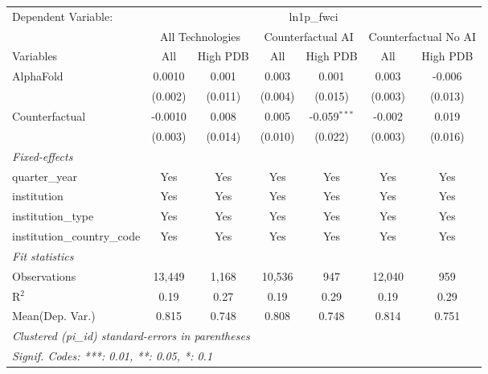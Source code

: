 \begingroup
\centering
\begin{tabular}{lcccccc}
   \tabularnewline \midrule \midrule
   Dependent Variable: & \multicolumn{6}{c}{ln1p\_fwci}\\
 & \multicolumn{2}{c}{All Technologies} & \multicolumn{2}{c}{Counterfactual AI} & \multicolumn{2}{c}{Counterfactual No AI} \\
\cmidrule(lr){1-1}\cmidrule(lr){2-3} \cmidrule(lr){4-5} \cmidrule(lr){6-7}
Variables & \multicolumn{1}{c}{All} & \multicolumn{1}{c}{High PDB} & \multicolumn{1}{c}{All} & \multicolumn{1}{c}{High PDB} & \multicolumn{1}{c}{All} & \multicolumn{1}{c}{High PDB} \\
\cmidrule(lr){1-1}\cmidrule(lr){2-2} \cmidrule(lr){3-3} \cmidrule(lr){4-4} \cmidrule(lr){5-5} \cmidrule(lr){6-6} \cmidrule(lr){7-7}
   AlphaFold                    & 0.0010  & 0.001   & 0.003   & 0.001          & 0.003   & -0.006\\   
                                & (0.002) & (0.011) & (0.004) & (0.015)        & (0.003) & (0.013)\\   
   Counterfactual               & -0.0010 & 0.008   & 0.005   & -0.059$^{***}$ & -0.002  & 0.019\\   
                                & (0.003) & (0.014) & (0.010) & (0.022)        & (0.003) & (0.016)\\   
   \midrule
   \emph{Fixed-effects}\\
   quarter\_year                & Yes     & Yes     & Yes     & Yes            & Yes     & Yes\\  
   institution                  & Yes     & Yes     & Yes     & Yes            & Yes     & Yes\\  
   institution\_type            & Yes     & Yes     & Yes     & Yes            & Yes     & Yes\\  
   institution\_country\_code   & Yes     & Yes     & Yes     & Yes            & Yes     & Yes\\  
   \midrule
   \emph{Fit statistics}\\
   Observations                 & 13,449  & 1,168   & 10,536  & 947            & 12,040  & 959\\  
   R$^2$                        & 0.19    & 0.27    & 0.19    & 0.29           & 0.19    & 0.29\\  
Mean(Dep. Var.) & 0.815 & 0.748 & 0.808 & 0.748 & 0.814 & 0.751 \\
   \midrule \midrule
   \multicolumn{7}{l}{\emph{Clustered (pi\_id) standard-errors in parentheses}}\\
   \multicolumn{7}{l}{\emph{Signif. Codes: ***: 0.01, **: 0.05, *: 0.1}}\\
\end{tabular}
\par\endgroup
